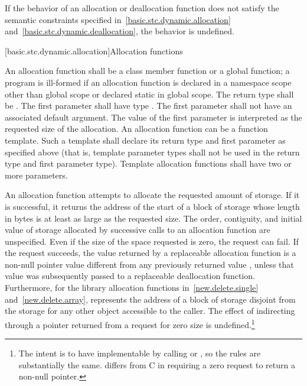 \pnum
If the behavior of an allocation or deallocation function
does not satisfy the semantic constraints
specified in~\ref{basic.stc.dynamic.allocation}
and~\ref{basic.stc.dynamic.deallocation},
the behavior is undefined.

[basic.stc.dynamic.allocation]{Allocation functions}

\pnum
{}%
An allocation function shall be a class member function or a global
function; a program is ill-formed if an allocation function is declared
in a namespace scope other than global scope or declared static in
global scope. The return type shall be . The first
parameter shall have type . The
first parameter shall not have an associated default
argument. The value of the first parameter
is interpreted as the requested size of the allocation. An allocation
function can be a function template. Such a template shall declare its
return type and first parameter as specified above (that is, template
parameter types shall not be used in the return type and first parameter
type). Template allocation functions shall have two or more parameters.

\pnum
An allocation function attempts to allocate the requested amount of
storage. If it is successful, it returns the address of the start
of a block of storage whose length in bytes is at least as large
as the requested size.
The order,
contiguity, and initial value of storage allocated by successive calls
to an allocation function are unspecified.
Even if the size of the space
requested is zero, the request can fail. If the request succeeds, the
value returned by a replaceable allocation function
is a non-null pointer value
 different from any previously returned value ,
unless that value  was subsequently passed to a
replaceable deallocation function.
Furthermore, for the library allocation functions
in~\ref{new.delete.single} and~\ref{new.delete.array},
 represents the address of a block of storage disjoint from the storage
for any other object accessible to the caller.
The effect of indirecting through a pointer
returned from a request for zero size is undefined.\footnote{The intent is
to have  implementable by
calling  or , so the rules are
substantially the same. \Cpp{} differs from C in requiring a zero request
to return a non-null pointer.}

